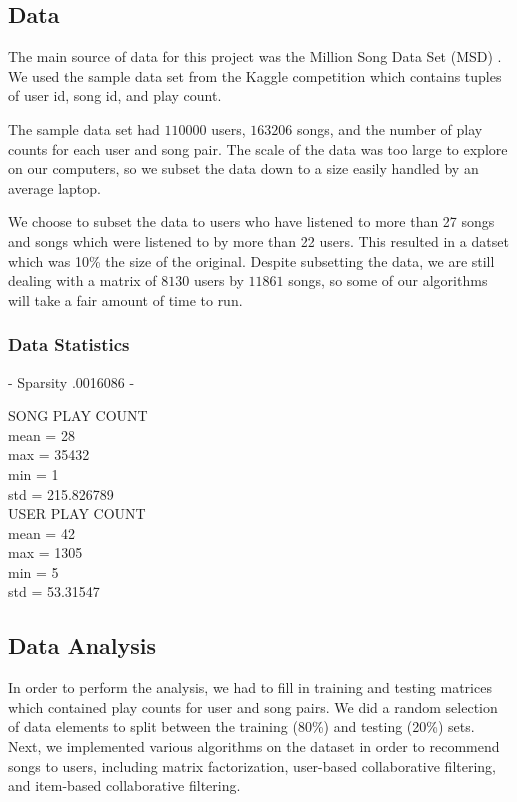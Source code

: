 \documentclass[12pt,preprint]{aastex}
\begin{document}
\subsection{Data}
The main source of data for this project was the Million Song Data Set (MSD)  \citep{Bertin-Mahieux2011}. We used the sample data set from the Kaggle competition which contains tuples of user id, song id, and play count.  

The sample data set had $110000$ users, $163206$ songs, and the number of play counts for each user and song pair.
The scale of the data was too large to explore on our computers, so we subset the data down to a size easily handled by an average laptop. 

We choose to subset the data to users who have listened to more than 27 songs and songs which were listened to by more than 22 users. This resulted in a datset which was 10\% the size of the original. Despite subsetting the data, we are still dealing with a matrix of $8130$ users by $11861$ songs, so some of our algorithms will take a fair amount of time to run.

\subsubsection{Data Statistics}

- Sparsity .0016086
- 

SONG PLAY COUNT  \\
mean = 28 \\
max = 35432 \\
min = 1 \\
std = 215.826789\\

USER PLAY COUNT\\
mean = 42\\
max = 1305\\
min = 5\\
std = 53.31547\\


\subsection{Data Analysis}
In order to perform the analysis, we had to fill in training and testing matrices which contained play counts for user and song pairs. We did a random selection of data elements to split between the training (80\%) and testing (20\%) sets. Next, we implemented various algorithms on the dataset in order to recommend songs to users, including matrix factorization, user-based collaborative filtering, and item-based collaborative filtering.
\end{document}
